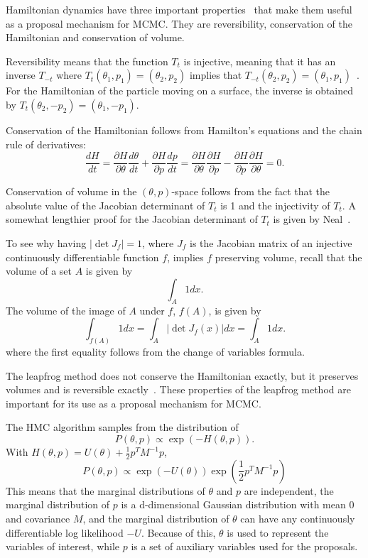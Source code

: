 \documentclass[english,twoside,openright]{HYgraduMLDS}
\begin{document}
Hamiltonian dynamics have three important properties~\cite{neal2012mcmc} 
that make them useful as a
proposal mechanism for MCMC. They are reversibility, 
conservation of the Hamiltonian and conservation of volume.

Reversibility means that the function \(T_t\) is injective, meaning that
it has an inverse \(T_{-t}\) where \(T_t(\theta_1, p_1) = (\theta_2, p_2)\)
implies that \(T_{-t}(\theta_2, p_2) = (\theta_1, p_1)\)~\cite{neal2012mcmc}.
For the Hamiltonian of the particle moving on a surface, the inverse 
is obtained by \(T_t(\theta_2, -p_2) = (\theta_1, -p_1)\).

Conservation of the Hamiltonian follows from Hamilton's equations and the 
chain rule of derivatives:
\[
    \frac{dH}{dt} = \frac{\partial H}{\partial \theta}\frac{d \theta}{dt}
    + \frac{\partial H}{\partial p}\frac{dp}{dt}
    = \frac{\partial H}{\partial \theta}\frac{\partial H}{\partial p}
    - \frac{\partial H}{\partial p}\frac{\partial H}{\partial \theta}
    = 0.
\]

Conservation of volume in the \((\theta, p)\)-space follows from the fact that 
the absolute value of the Jacobian determinant of \(T_t\) is 1 and the 
injectivity of \(T_t\). A somewhat 
lengthier proof for the Jacobian determinant of \(T_t\) is given by 
Neal~\cite{neal2012mcmc}. 

To see why 
having \(|\det J_f| = 1\), where \(J_f\) is the Jacobian matrix of an injective 
continuously differentiable function \(f\), 
implies \(f\) preserving volume, recall that the volume of a set 
\(A\) is given by 
\[
    \int_A 1dx.
\]
The volume of the image of \(A\) under \(f\), \(f(A)\), is given by
\[
    \int_{f(A)}1dx = \int_{A}|\det J_f(x)|dx = \int_A 1dx.
\]
where the first equality follows from the change of variables formula.

The leapfrog method does not conserve the Hamiltonian exactly, but it 
preserves volumes and is reversible exactly~\cite{neal2012mcmc}. 
These properties of the leapfrog 
method are important for its use as a proposal mechanism for MCMC.

The HMC algorithm samples from the distribution of~\cite{neal2012mcmc}
\[
    P(\theta, p) \propto \exp(-H(\theta, p)).
\]
With \(H(\theta, p) = U(\theta) + \frac{1}{2}p^{T}M^{-1}p\),
\[
    P(\theta, p) \propto \exp(-U(\theta))\exp\left(\frac{1}{2}p^{T}M^{-1}p\right)
\]
This means that the marginal distributions of \(\theta\) and \(p\) are 
independent, the marginal distribution of \(p\) is a d-dimensional
Gaussian distribution 
with mean 0 and covariance \(M\), and the marginal distribution of
\(\theta\) can have any continuously differentiable log likelihood \(-U\).
Because of this, \(\theta\) is used to represent the variables of interest,
while \(p\) is a set of auxiliary variables used for the proposals.
\end{document}
